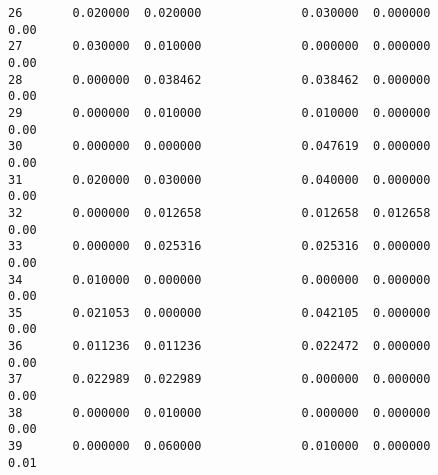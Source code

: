 \documentclass[11pt]{article}
\begin{document}
\begin{tcolorbox}[breakable, size=fbox, boxrule=.5pt, pad at break*=1mm, opacityfill=0]
\begin{Verbatim}[commandchars=\\\{\}]
26       0.020000  0.020000              0.030000  0.000000            0.00
27       0.030000  0.010000              0.000000  0.000000            0.00
28       0.000000  0.038462              0.038462  0.000000            0.00
29       0.000000  0.010000              0.010000  0.000000            0.00
30       0.000000  0.000000              0.047619  0.000000            0.00
31       0.020000  0.030000              0.040000  0.000000            0.00
32       0.000000  0.012658              0.012658  0.012658            0.00
33       0.000000  0.025316              0.025316  0.000000            0.00
34       0.010000  0.000000              0.000000  0.000000            0.00
35       0.021053  0.000000              0.042105  0.000000            0.00
36       0.011236  0.011236              0.022472  0.000000            0.00
37       0.022989  0.022989              0.000000  0.000000            0.00
38       0.000000  0.010000              0.000000  0.000000            0.00
39       0.000000  0.060000              0.010000  0.000000            0.01


\end{Verbatim}
\end{tcolorbox}
\end{document}
